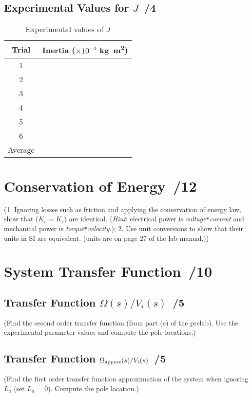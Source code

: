\documentclass{article}
\newcommand{\score}{\hfill \underline{\hspace{0.65cm}}\,/} %
\begin{document}
\subsection{Experimental Values for $J$ \score 4}
\begin{table}[phtb] 
\begin{center}
\caption{Experimental values of $J$}
\label{fig:lab4_q5}
\begin{tabular}{c|l}\hline \hline
\cellcolor{lightgray} Trial & \cellcolor{lightgray} Inertia ($\times10^{-4}$ \si{\kg\m\squared}) \\
\hline
1 &  \\ \hline
2 &  \\ \hline
3 &  \\ \hline
4 &  \\ \hline
5 &  \\ \hline
6 &  \\ \hline
Average &  \\ \hline
\end{tabular}
\end{center}
\end{table}

\section{Conservation of Energy \score 12}
(1. Ignoring losses such as friction and applying the conservation of energy law, show that ($K_v=K_{\tau}$) are identical. (\emph{Hint}: electrical power is \emph{voltage}\verb|*|\emph{current} and mechanical power is \emph{torque}\verb|*|\emph{velocity}.); 2. Use unit conversions to show that their units in SI are equivalent. (units are on page 27 of the lab manual.))

\section{System Transfer Function \score 10}
\subsection{Transfer Function $\Omega(s)/V_i(s)$ \score 5}
(Find the second order transfer function (from part (e) of the prelab). Use the experimental parameter values and compute the pole locations.)

\subsection{Transfer Function $\Omega_{\rm approx}(s)/V_i(s)$ \score 5}
(Find the first order transfer function approximation of the system when ignoring $L_a$ (set $L_a$ = 0). Compute the pole location.)
\end{document}
